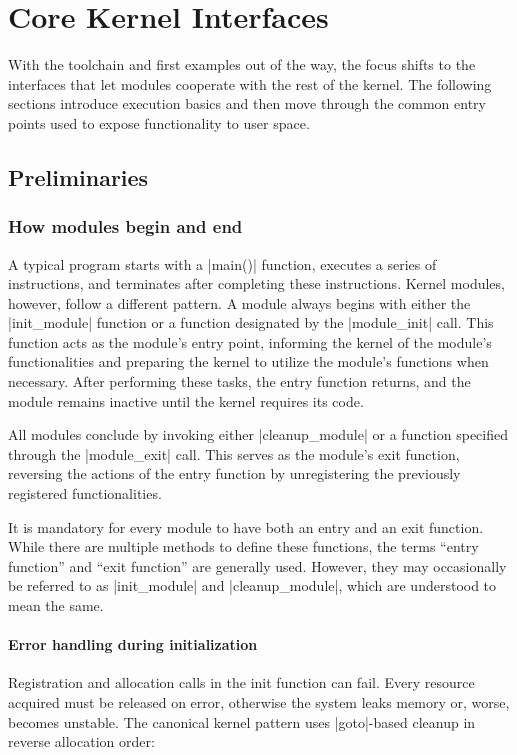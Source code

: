 \documentclass[10pt, oneside]{book}
\begin{document}
\chapter{Core Kernel Interfaces}
With the toolchain and first examples out of the way, the focus shifts to the
interfaces that let modules cooperate with the rest of the kernel. The
following sections introduce execution basics and then move through the common
entry points used to expose functionality to user space.

\section{Preliminaries}
\subsection{How modules begin and end}
\label{sec:module_init_exit}
A typical program starts with a \cpp|main()| function, executes a series of instructions,
and terminates after completing these instructions.
Kernel modules, however, follow a different pattern.
A module always begins with either the \cpp|init_module| function or a function designated by the \cpp|module_init| call.
This function acts as the module's entry point,
informing the kernel of the module's functionalities and preparing the kernel to utilize the module's functions when necessary.
After performing these tasks, the entry function returns, and the module remains inactive until the kernel requires its code.

All modules conclude by invoking either \cpp|cleanup_module| or a function specified through the \cpp|module_exit| call.
This serves as the module's exit function, reversing the actions of the entry function by unregistering the previously registered functionalities.

It is mandatory for every module to have both an entry and an exit function.
While there are multiple methods to define these functions, the terms ``entry function'' and ``exit function'' are generally used.
However, they may occasionally be referred to as \cpp|init_module| and \cpp|cleanup_module|,
which are understood to mean the same.

\subsubsection{Error handling during initialization}
\label{sec:init_error_handling}
Registration and allocation calls in the init function can fail.
Every resource acquired must be released on error, otherwise the system leaks memory or, worse, becomes unstable.
The canonical kernel pattern uses \cpp|goto|-based cleanup in reverse allocation order:
\end{document}
